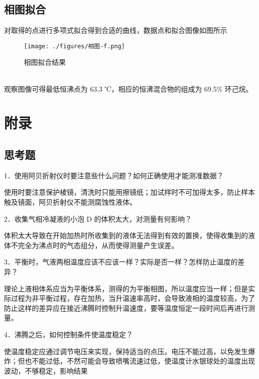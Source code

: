 \documentclass[4pt,a4papper]{article}
\begin{document}
\newpage

\subsection{相图拟合}
对取得的点进行多项式拟合得到合适的曲线，数据点和拟合图像如图所示
    \begin{figure}[htb]
        \centering
        \texttt{[image: ./figures/相图-f.png]}
        \caption{相图拟合结果} \label{fig: 3}
    \end{figure}
~\\


观察图像可得最低恒沸点为 63.3 ℃，相应的恒沸混合物的组成为 69.5\% 环己烷。

\newpage


\section{附录}
\subsection{思考题}
1．使用阿贝折射仪时要注意些什么问题？如何正确使用才能测准数据？ 

使用时要注意保护棱镜，清洗时只能用擦镜纸；加试样时不可加得太多，防止样本触及镜面，阿贝折射仪不能测腐蚀性液体。

2．收集气相冷凝液的小泡 D 的体积太大，对测量有何影响？

体积太大导致在开始加热时所收集到的液体无法得到有效的置换，使得收集到的液体不完全为沸点时的气态组分，从而使得测量产生误差。

3．平衡时，气液两相温度应该不应该一样？实际是否一样？怎样防止温度的差异？

理论上液相体系应当为平衡体系，测得的为平衡相图，所以温度应当一样；但是实际过程为非平衡过程，存在加热，当升温速率高时，会导致液相的温度较高，为了防止这样的差异应在接近沸腾时控制升温速度，要等温度恒定一段时间后再进行测量。

4．沸腾之后，如何控制条件使温度稳定？

使温度稳定应通过调节电压来实现，保持适当的点压。电压不能过高，以免发生爆炸；但也不能过低，不然可能会导致喷嘴流速过低，使温度计水银球处的温度出现波动，不够稳定，影响结果



\clearpage
\end{document}
